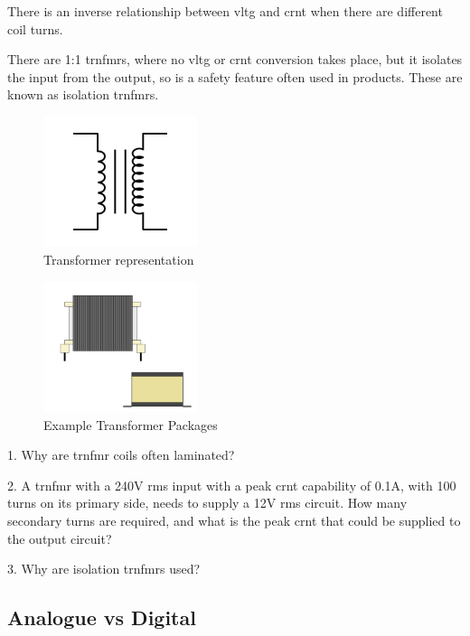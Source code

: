\documentclass[a4paper,11pt]{report}
\newcommand{\Quiz}[1] %
{
\par\noindent %
\phantomsection %
\todo[inline, color=blue!30]{\textbf{#1}} %
\vspace{1em} %
}
\begin{document}
There is an inverse relationship between \gls{vltg} and \gls{crnt} when there are different coil turns.

There are 1:1 \gls{trnfmr}s, where no \gls{vltg} or \gls{crnt} conversion takes place, but it isolates the input from the output, so is a safety feature often used in products. These are known as isolation \gls{trnfmr}s.

\begin{figure}[H]
\centering
\includegraphics[width=0.4\textwidth]{Transformer1}
\caption{Transformer representation}
\end{figure}

\begin{figure}[H]
\centering
\includegraphics[width=0.4\textwidth]{TransformerPackages}
\caption{Example Transformer Packages}
\end{figure}

\Quiz{Quiz}

1. Why are \gls{trnfmr} coils often laminated?

2. A \gls{trnfmr} with a 240V \gls{rms} input with a peak \gls{crnt} capability of 0.1A, with 100 turns on its primary side, needs to supply a 12V \gls{rms} circuit. How many secondary turns are required, and what is the peak \gls{crnt} that could be supplied to the output circuit?

3. Why are isolation \gls{trnfmr}s used?

\vspace*{1\baselineskip}

\subsection{Analogue vs Digital}
\end{document}
